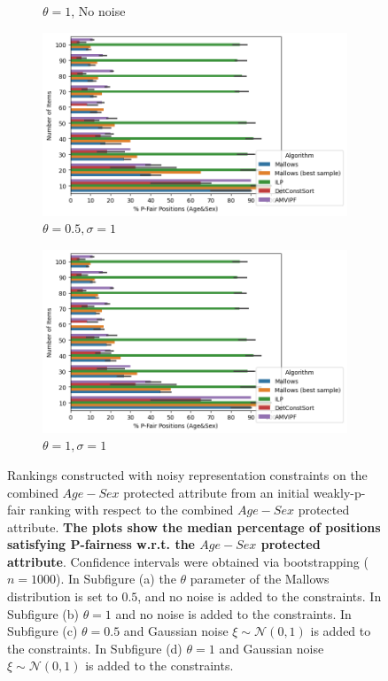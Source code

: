 \begin{figure}
\begin{subfigure}{0.4\textwidth}
         \caption{$\theta = 1$, No noise}
         \label{fig:10pfair}
     \end{subfigure}\quad
     \begin{subfigure}{0.4\textwidth}
         \centering
         \includegraphics[width=\textwidth]{resources/01/p_pfair.png}
         \caption{$\theta = 0.5, \sigma=1$}
         \label{fig:01pfair}
     \end{subfigure}\quad
     \begin{subfigure}{0.4\textwidth}
         \centering
         \includegraphics[width=\textwidth]{resources/11/p_pfair.png}
         \caption{$\theta = 1, \sigma=1$}
         \label{fig:11pfair}
     \end{subfigure}\quad
  \caption{ 
  Rankings constructed with noisy representation constraints on the combined $Age-Sex$ protected attribute from an initial weakly-p-fair ranking with respect to the combined $Age-Sex$ protected attribute. \textbf{The plots show the median percentage of positions satisfying P-fairness w.r.t. the $Age-Sex$ protected attribute}. Confidence intervals were obtained via bootstrapping ($n=1000$). In Subfigure (a) the $\theta$ parameter of the Mallows distribution is set to $0.5$, and no noise is added to the constraints. In Subfigure (b) $\theta=1$ and no noise is added to the constraints. In Subfigure (c) $\theta=0.5$ and Gaussian noise $\xi\sim \mathcal{N}(0,1)$ is added to the constraints. In Subfigure  (d) $\theta=1$ and Gaussian noise $\xi\sim \mathcal{N}(0,1)$ is added to the constraints.  
  }
  \label{plot:pfair}
\end{figure}

